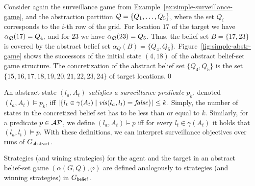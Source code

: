 \begin{example}\label{ex:simple-abstr-game}
Consider again the surveillance game from Example~\ref{ex:simple-surveillance-game}, and the abstraction partition $\mathcal{Q} = \{Q_1,\ldots,Q_5\}$, where the set $Q_i$ corresponds to the $i$-th row of the grid. For location $17$ of the target we have $\alpha_{\mathcal{Q}}(17) = Q_4$, and for  $23$ we have $\alpha_{\mathcal{Q}}(23) = Q_5$. Thus, the belief set $B = \{17,23\}$ is covered by the abstract belief set $\alpha_Q(B) = \{Q_4,Q_5\}$. Figure~\ref{fig:simple-abstr-game} shows the successors of the initial state $(4,18)$ of the abstract belief-set game structure. The concretization of the abstract belief set $\{Q_4,Q_5\}$ is the set $\{15,16,17,18,19,20,21,22,23,24\}$ of target locations.\qed
\end{example}

An abstract state $(l_a,A_t)$ \emph{satisfies a surveillance predicate $p_k$}, denoted $(l_a,A_t) \models p_k$, iff 
$|\{l_t \in \gamma(A_t) \mid \mathit{vis}(l_a,l_t)  = \mathit{false} \}| \leq k$. Simply, the number of states in the concretized belief set has to be less than or equal to $k$. Similarly, for a predicate $p \in \mathcal{AP}$, we define $(l_a,A_t) \models p$ iff for every $l_t \in \gamma(A_t)$ it holds that $(l_a,l_t) \models p$. With these definitions, we can interpret surveillance objectives over runs of $G_{\mathsf{abstract}}$.

Strategies (and wining strategies) for the agent and the target in an abstract belief-set game $(\alpha(G,Q),\varphi)$ are defined analogously to strategies (and winning strategies) in $G_{\mathsf{belief}}$.